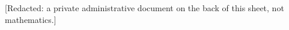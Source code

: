 \margin{$\unsure{\longleftarrow}$}
[Redacted: a private administrative document on the back of this sheet, not mathematics.]
